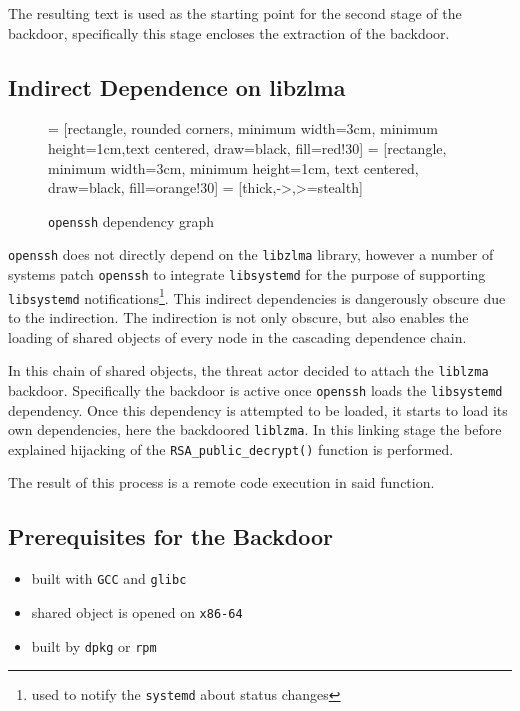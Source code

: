 The resulting text is used as the starting point for the second stage of the
backdoor, specifically this stage encloses the extraction of the backdoor.


\subsection{Indirect Dependence on libzlma}
\label{sec:dependence}

\begin{figure}[H]
    \centering

     = [rectangle, rounded corners, minimum width=3cm, minimum height=1cm,text centered, draw=black, fill=red!30]
     = [rectangle, minimum width=3cm, minimum height=1cm, text centered, draw=black, fill=orange!30]
     = [thick,->,>=stealth]
    \label{chart:dependecies}
    \caption{\texttt{openssh} dependency graph}
\end{figure}

\texttt{openssh} does not directly depend on the \texttt{libzlma} library,
however a number of systems patch \texttt{openssh} to integrate
\texttt{libsystemd} for the purpose of supporting \texttt{libsystemd}
notifications\footnote{used to notify the \texttt{systemd} about status
changes}. This indirect dependencies is dangerously obscure due to the
indirection. The indirection is not only obscure, but also enables the loading
of shared objects of every node in the cascading dependence chain. 

In this chain of shared objects, the threat actor decided to attach the
\texttt{liblzma} backdoor. Specifically the backdoor is active once
\texttt{openssh} loads the \texttt{libsystemd} dependency. Once this dependency
is attempted to be loaded, it starts to load its own dependencies, here the
backdoored \texttt{liblzma}. In this linking stage the before explained
hijacking of the \texttt{RSA\_public\_decrypt()} function is performed.

The result of this process is a remote code execution in said function.

\subsection{Prerequisites for the Backdoor}

\begin{itemize}
    \item built with \texttt{GCC} and \texttt{glibc}
    \item shared object is opened on \texttt{x86-64}
    \item built by \texttt{dpkg} or \texttt{rpm}
\end{itemize}

